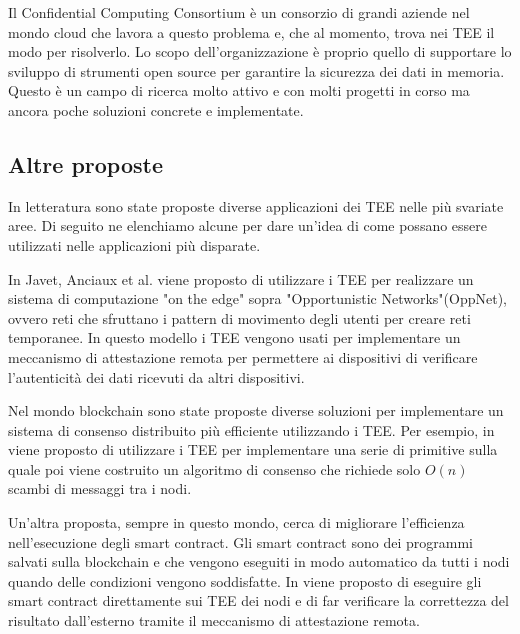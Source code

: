 \documentclass[12pt,italian]{report}
\begin{document}
Il Confidential Computing Consortium\cite{confidential_computing_consortium}
è un consorzio di grandi aziende nel mondo cloud che lavora a questo problema
e, che al momento, trova nei TEE il modo per risolverlo.
Lo scopo dell'organizzazione è proprio quello di supportare lo sviluppo
di strumenti open source per garantire la sicurezza dei dati in memoria.
Questo è un campo di ricerca molto attivo e con molti progetti in corso ma
ancora poche soluzioni concrete e implementate.

\subsection{Altre proposte}
\label{subsec:altre-proposte}
In letteratura sono state proposte diverse applicazioni dei TEE nelle più
svariate aree. Di seguito ne elenchiamo alcune per dare un'idea di come
possano essere utilizzati nelle applicazioni più disparate.

\bigbreak \noindent

In Javet, Anciaux et al.\cite{teeuses_edgeletcomputing} viene proposto di
utilizzare i TEE per realizzare un sistema di computazione "on the edge" sopra
"Opportunistic Networks"(OppNet), ovvero reti che sfruttano i
pattern di movimento degli utenti per creare reti temporanee.
In questo modello i TEE vengono usati per implementare un meccanismo di
attestazione remota per permettere ai dispositivi di verificare l'autenticità
dei dati ricevuti da altri dispositivi.

\bigbreak \noindent

Nel mondo blockchain sono state proposte diverse soluzioni per implementare
un sistema di consenso distribuito più efficiente utilizzando i TEE.
Per esempio, in \cite{teeuses_blockchainconsent} viene proposto di utilizzare
i TEE per implementare una serie di primitive sulla quale poi viene
costruito un algoritmo di consenso che richiede solo $O(n)$ scambi di messaggi
tra i nodi.

Un'altra proposta, sempre in questo mondo, cerca di migliorare l'efficienza
nell'esecuzione degli smart contract.
Gli smart contract sono dei programmi salvati sulla blockchain e che vengono
eseguiti in modo automatico da tutti i nodi quando delle condizioni vengono
soddisfatte.
In \cite{teeuses_smartcontract} viene proposto di eseguire gli smart contract
direttamente sui TEE dei nodi e di far verificare la correttezza del risultato
dall'esterno tramite il meccanismo di attestazione remota.

\bigbreak \noindent
\end{document}
